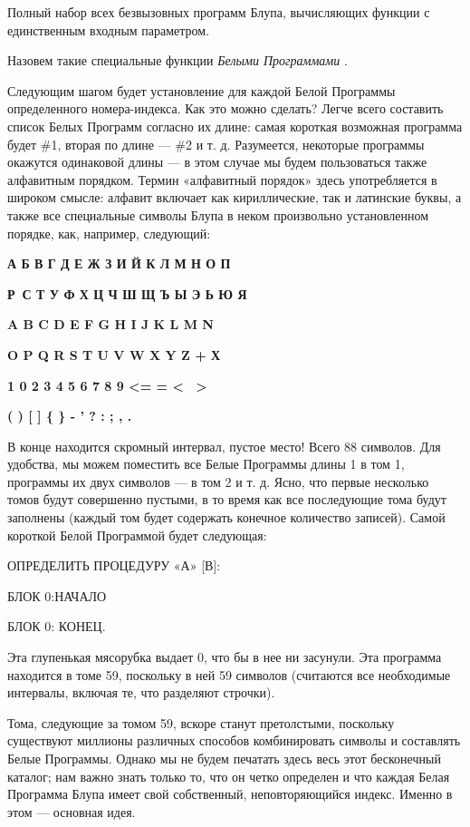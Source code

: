 \documentclass[../main.tex]{subfiles}
\begin{document}
Полный набор всех безвызовных программ Блупа, вычисляющих функции с единственным входным параметром.

Назовем такие специальные функции \emph{Белыми Программами} .

Следующим шагом будет установление для каждой Белой Программы определенного номера-индекса. Как это можно сделать? Легче всего составить список Белых Программ согласно их длине: самая короткая возможная программа будет \#1, вторая по длине --- \#2 и т. д. Разумеется, некоторые программы окажутся одинаковой длины --- в этом случае мы будем пользоваться также алфавитным порядком. Термин «алфавитный порядок» здесь употребляется в широком смысле: алфавит включает как кириллические, так и латинские буквы, а также все специальные символы Блупа в неком произвольно установленном порядке, как, например, следующий:

\textbf{А Б В Г Д Е Ж З И Й К Л М Н О П}

\textbf{Р~С Т У Ф Х Ц Ч Ш Щ Ъ Ы Э Ь Ю Я}

\textbf{A B C D E F G H I J K L M N}

\textbf{O P Q R S T U V W X Y Z + Х}

\textbf{1 0 2 3 4 5 6 7 8 9 \textless= = \textless~ \textgreater{}}

\textbf{( ) {[} {]} \{ \} - ' ? : ; , .}

В конце находится скромный интервал, пустое место! Всего 88 символов. Для удобства, мы можем поместить все Белые Программы длины 1 в том 1, программы их двух символов --- в том 2 и т. д. Ясно, что первые несколько томов будут совершенно пустыми, в то время как все последующие тома будут заполнены (каждый том будет содержать конечное количество записей). Самой короткой Белой Программой будет следующая:

ОПРЕДЕЛИТЬ ПРОЦЕДУРУ «А» {[}В{]}:

БЛОК 0:НАЧАЛО

БЛОК 0: КОНЕЦ.

Эта глупенькая мясорубка выдает 0, что бы в нее ни засунули. Эта программа находится в томе 59, поскольку в ней 59 символов (считаются все необходимые интервалы, включая те, что разделяют строчки).

Тома, следующие за томом 59, вскоре станут претолстыми, поскольку существуют миллионы различных способов комбинировать символы и составлять Белые Программы. Однако мы не будем печатать здесь весь этот бесконечный каталог; нам важно знать только то, что он четко определен и что каждая Белая Программа Блупа имеет свой собственный, неповторяющийся индекс. Именно в этом --- основная идея.
\end{document}
